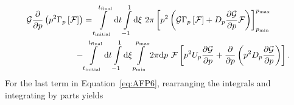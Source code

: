 \documentclass[preprint,aip]{revtex4-2}
\begin{document}
\begin{subequations}
\begin{equation}
\begin{aligned}
	\mathcal{G}\frac{\partial}{\partial p}\left(p^2\Gamma_p\left[\mathcal{F}\right]\right) &=
	\int\displaylimits_{t_\mathrm{initial}}^{t_\mathrm{final}}\mathrm{d}t
\int\displaylimits_{-1}^{1}\mathrm{d}\xi \ 2\pi
	\left[p^2\left(\mathcal{G}\Gamma_p\left[\mathcal{F}\right] + D_p\frac{\partial\mathcal{G}}{\partial p}\mathcal{F}\right)\right]_{p_\mathrm{min}}^{p_\mathrm{max}} \\
	- &\int\displaylimits_{t_\mathrm{initial}}^{t_\mathrm{final}}\mathrm{d}t
\int\displaylimits_{-1}^{1}\mathrm{d}\xi
\int\displaylimits_{p_\mathrm{min}}^{p_\mathrm{max}}2\pi \mathrm{d}p \ \mathcal{F} \left[ p^2U_p\frac{\partial\mathcal{G}}{\partial p} + \frac{\partial}{\partial p}\left(p^2D_p\frac{\partial\mathcal{G}}{\partial p}\right)\right].
\end{aligned}
\end{equation}
\end{subequations}
For the last term in Equation~\ref{eq:AFP6}, rearranging the integrals and integrating by parts yields
\end{document}
